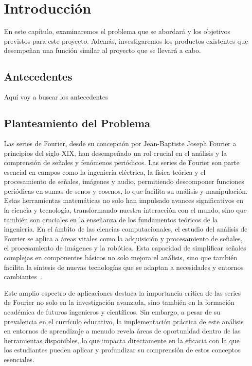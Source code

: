 \chapter{Introducción}\label{ch:Introducción}
En este capítulo, examinaremos el problema que se abordará y los objetivos previstos para este proyecto. Además, investigaremos los productos existentes que desempeñan una función similar al proyecto que se llevará a cabo.

\section{Antecedentes}
Aquí voy a buscar los antecedentes

\section{Planteamiento del Problema}
Las series de Fourier, desde su concepción por Jean-Baptiste Joseph Fourier a principios del siglo XIX, han desempeñado un rol crucial en el análisis y la comprensión de señales y fenómenos periódicos. Las series de Fourier son parte esencial en campos como la ingeniería eléctrica, la física teórica y el procesamiento de señales, imágenes y audio, permitiendo descomponer funciones periódicas en sumas de senos y cosenos, lo que facilita su análisis y manipulación. Estas herramientas matemáticas no solo han impulsado avances significativos en la ciencia y tecnología, transformando nuestra interacción con el mundo, sino que también son cruciales en la enseñanza de los fundamentos teóricos de la ingeniería. En el ámbito de las ciencias computacionales, el estudio del análisis de Fourier se aplica a áreas vitales como la adquisición y procesamiento de señales, el procesamiento de imágenes y la robótica. Esta capacidad de simplificar señales complejas en componentes básicos no solo mejora el análisis, sino que también facilita la síntesis de nuevas tecnologías que se adaptan a necesidades y entornos cambiantes~\cite{almira2017fourier}.

Este amplio espectro de aplicaciones destaca la importancia crítica de las series de Fourier no solo en la investigación avanzada, sino también en la formación académica de futuros ingenieros y científicos. Sin embargo, a pesar de su prevalencia en el currículo educativo, la implementación práctica de este análisis en entornos de aprendizaje a menudo revela áreas de oportunidad dentro de las herramientas disponibles, lo que impacta directamente en la eficacia con la que los estudiantes pueden aplicar y profundizar su comprensión de estos conceptos esenciales.

